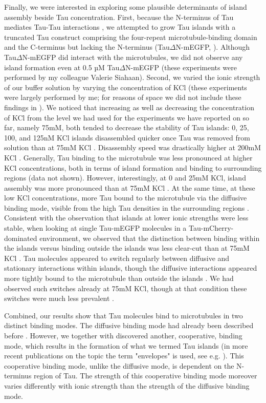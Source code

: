 Finally, we were interested in exploring some plausible determinants of island assembly beside Tau concentration. First, because the N-terminus of Tau mediates Tau-Tau interactions \parencite{Gamblin2003}, we attempted to grow Tau islands with a truncated Tau construct comprising the four-repeat microtubule-binding domain and the C-terminus but lacking the N-terminus (Tau$\Delta$N-mEGFP, ). Although Tau$\Delta$N-mEGFP did interact with the microtubules, we did not observe any island formation even at 0.5 µM Tau$\Delta$N-mEGFP (these experiments were performed by my colleague Valerie Siahaan). Second, we varied the ionic strength of our buffer solution by varying the concentration of KCl (these experiments were largely performed by me; for reasons of space we did not include these findings in \cite{Siahaan2019a}). We noticed that increasing as well as decreasing the concentration of KCl from the level we had used for the experiments we have reported on so far, namely 75mM, both tended to decrease the stability of Tau islands: 0, 25, 100, and 125nM KCl islands disassembled quicker once Tau was removed from solution than at 75mM KCl . Disassembly speed was drastically higher at 200mM KCl . Generally, Tau binding to the microtubule was less pronounced at higher KCl concentrations, both in terms of island formation and binding to surrounding regions (data not shown). However, interestingly, at 0 and 25mM KCl, island assembly was more pronounced than at 75mM KCl . At the same time, at these low KCl concentrations, more Tau bound to the microtubule via the diffusive binding mode, visible from the high Tau densities in the surrounding regions . Consistent with the observation that islands at lower ionic strengths were less stable, when looking at single Tau-mEGFP molecules in a Tau-mCherry-dominated environment, we observed that the distinction between binding within the islands versus binding outside the islands was less clear-cut than at 75mM KCl . Tau molecules appeared to switch regularly between diffusive and stationary interactions within islands, though the diffusive interactions appeared more tightly bound to the microtubule than outside the islands . We had observed such switches already at 75mM KCl, though at that condition these switches were much less prevalent .\par

Combined, our results show that Tau molecules bind to microtubules in two distinct binding modes. The diffusive binding mode had already been described before \parencite{Hinrichs2012b}. However, we together with \cite{tan2019microtubules} discovered another, cooperative, binding mode, which results in the formation of what we termed Tau islands (in more recent publications on the topic the term "envelopes" is used, see e.g. \cite{siahaan2022microtubule}). This cooperative binding mode, unlike the diffusive mode, is dependent on the N-terminus region of Tau. The strength of this cooperative binding mode moreover varies differently with ionic strength than the strength of the diffusive binding mode.